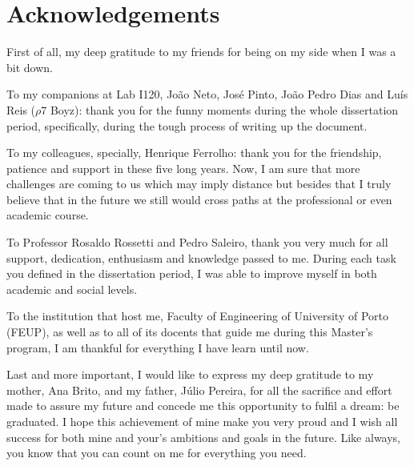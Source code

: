 \chapter*{Acknowledgements}

First of all, my deep gratitude to my friends for being on my side when I was a bit down.

\medskip

To my companions at Lab I120, João Neto, José Pinto, João Pedro Dias and Luís Reis ($\rho$7 Boyz): thank you for the funny moments during the whole dissertation period, specifically, during the tough process of writing up the document.

\medskip

To my colleagues, specially, Henrique Ferrolho: thank you for the friendship, patience and support in these five long years. Now, I am sure that more challenges are coming to us which may imply distance but besides that I truly believe that in the future we still would cross paths at the professional or even academic course.

\medskip

To Professor Rosaldo Rossetti and Pedro Saleiro, thank you very much for all support, dedication, enthusiasm and knowledge passed to me. During each task you defined in the dissertation period, I was able to improve myself in both academic and social levels.

\medskip

To the institution that host me, Faculty of Engineering of University of Porto (FEUP), as well as to all of its docents that guide me during this Master's program, I am thankful for everything I have learn until now.

\medskip

Last and more important, I would like to express my deep gratitude to my mother, Ana Brito, and my father, Júlio Pereira, for all the sacrifice and effort made to assure my future and concede me this opportunity to fulfil a dream: be graduated. I hope this achievement of mine make you very proud and I wish all success for both mine and your's ambitions and goals in the future. Like always, you know that you can count on me for everything you need.

\vspace{10mm}
